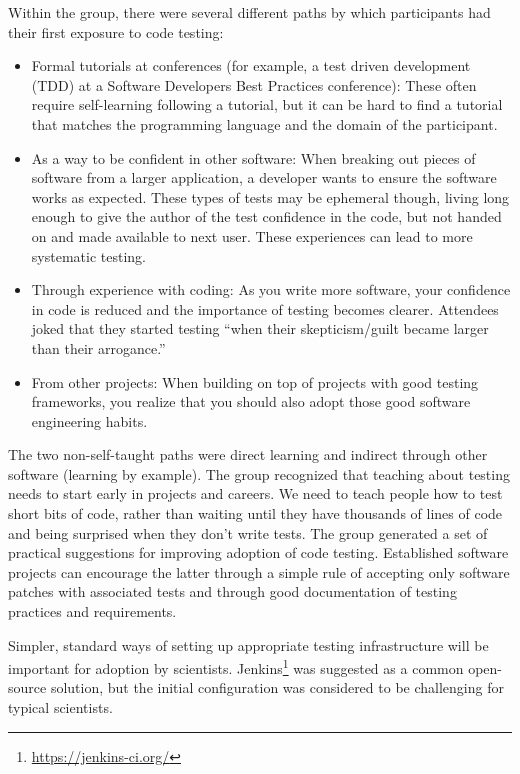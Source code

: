 \documentclass[11pt, oneside]{amsart}
\begin{document}
Within the group, there were several different paths by which participants had their 
first exposure to code testing:
\begin{itemize}

\item Formal tutorials at conferences (for example, a test driven development
(TDD) at a Software Developers Best Practices conference): These often require
self-learning following a tutorial, but it can be hard to find a tutorial that
matches the programming language and the domain of the participant.

\item As a way to be confident in other software: When breaking out pieces of
software from a larger application, a developer wants to ensure the software
works as expected. These types of tests may be ephemeral though, living long
enough to give the author of the test confidence in the code, but not handed on
and made available to next user. These experiences can lead to more systematic
testing.

\item Through experience with coding: As you write more software, your
confidence in code is reduced and the importance of testing becomes clearer.
Attendees joked that they started testing ``when their skepticism/guilt became
larger than their arrogance.''

\item From other projects: When building on top of projects with good testing
frameworks, you realize that you should also adopt those good software
engineering habits.

\end{itemize}

The two non-self-taught paths were direct learning and indirect through other
software (learning by example). The group recognized that teaching about testing
needs to start early in projects and careers. We need to teach people how to
test short bits of code, rather than waiting until they have thousands of lines
of code and being surprised when they don't write tests. The group generated a
set of practical suggestions for improving adoption of code testing.
%
Established software projects can encourage the latter through a simple rule of
accepting only software patches with associated tests and through good
documentation of testing practices and requirements.

Simpler, standard ways of setting up appropriate testing infrastructure will be
important for adoption by scientists. Jenkins\footnote{\url{https://jenkins-ci.org/}} 
was suggested as a common open-source
solution, but the initial configuration was considered to be challenging for
typical scientists.
\end{document}
